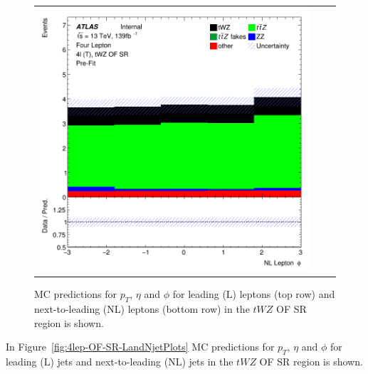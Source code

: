 \begin{figure}[htbp]
\begin{tabular}{ccc}
    \includegraphics[width=.3\textwidth]{figures/PreFitPlots/lep4_tWZ_4T_OF_NL_lepton_phi.png} \\

  \end{tabular}
    \caption{MC predictions for $p_{T}$, $\eta$ and $\phi$ for leading (L) leptons (top row) and next-to-leading (NL) leptons (bottom row) in the $tWZ$ OF SR region  is shown.}
  \label{fig:4lep-OF-SR-leptonPlots}
\end{figure}

In Figure~\ref{fig:4lep-OF-SR-LandNjetPlots} MC predictions for $p_{T}$, $\eta$ and $\phi$ for leading (L) jets and next-to-leading (NL) jets in the $tWZ$ OF SR region is shown.

